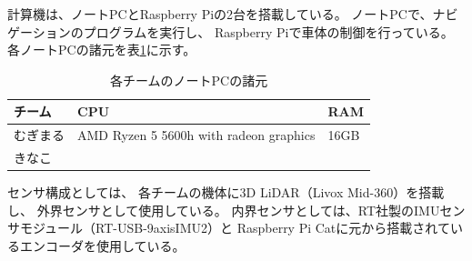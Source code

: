 \documentclass[twocolumn,9pt]{jsproceedings}
\begin{document}
計算機は、ノートPCとRaspberry Piの2台を搭載している。
ノートPCで、ナビゲーションのプログラムを実行し、
Raspberry Piで車体の制御を行っている。
各ノートPCの諸元を表\ref{table:laptop}に示す。

\begin{table}[H]
  \centering
  \caption{各チームのノートPCの諸元}
  \label{table:laptop}
	  \begin{tabular}{|l|p{5.0cm}|l|}
    \hline
    チーム   & CPU & RAM\\ 
    \hline
    むぎまる & AMD Ryzen 5 5600h with radeon graphics & 16GB \\
    \hline
    きなこ  & & \\
    \hline
  \end{tabular}
\end{table}

センサ構成としては、
各チームの機体に3D LiDAR（Livox Mid-360）を搭載し、
外界センサとして使用している。
内界センサとしては、RT社製のIMUセンサモジュール（RT-USB-9axisIMU2）と
Raspberry Pi Catに元から搭載されているエンコーダを使用している。
\end{document}
